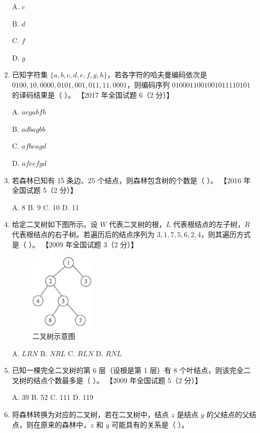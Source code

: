 \documentclass[lang=cn,newtx,10pt,scheme=chinese]{../../elegantbook}
\begin{document}
\begin{enumerate}
    A. $c$  

    B. $d$  

    C. $f$  

    D. $g$  

    \item 已知字符集 $\{a, b, c, d, e, f, g, h\}$，若各字符的哈夫曼编码依次是 $0100, 10, 0000, 0101, 001, 011, 11, 0001$，则编码序列 $0100011001001011110101$ 的译码结果是（ ）。  
    【2017 年全国试题 6（2 分）】  

    A. $acgabfh$  

    B. $adbagbb$  

    C. $afbeagd$  

    D. $afeefgd$  

    \item 若森林已知有 15 条边、25 个结点，则森林包含树的个数是（ ）。  
    【2016 年全国试题 5（2 分）】 

    A. 8 \quad B. 9 \quad C. 10 \quad D. 11  

    \item 给定二叉树如下图所示。设 $W$ 代表二叉树的根，$L$ 代表根结点的左子树，$R$ 代表根结点的右子树。若遍历后的结点序列为 $3, 1, 7, 5, 6, 2, 4$，则其遍历方式是（ ）。  
    【2009 年全国试题 3（2 分）】  

    \begin{figure}[h!]
            \centering
            \includegraphics[width=0.3\textwidth]{../../figure/exercisePicPDF/chapter6/6-9.pdf}
            \caption{二叉树示意图}
    \end{figure}

    A. $LRN$ \quad B. $NRL$ \quad C. $RLN$ \quad D. $RNL$  

    \item 已知一棵完全二叉树的第 6 层（设根是第 1 层）有 8 个叶结点，则该完全二叉树的结点个数最多是（ ）。  
    【2009 年全国试题 5（2 分）】  

    A. 39 \quad B. 52 \quad C. 111 \quad D. 119  

    \item 将森林转换为对应的二叉树，若在二叉树中，结点 $z$ 是结点 $y$ 的父结点的父结点，则在原来的森林中，$z$ 和 $y$ 可能具有的关系是（ ）。  
    

\end{enumerate}
\end{document}
